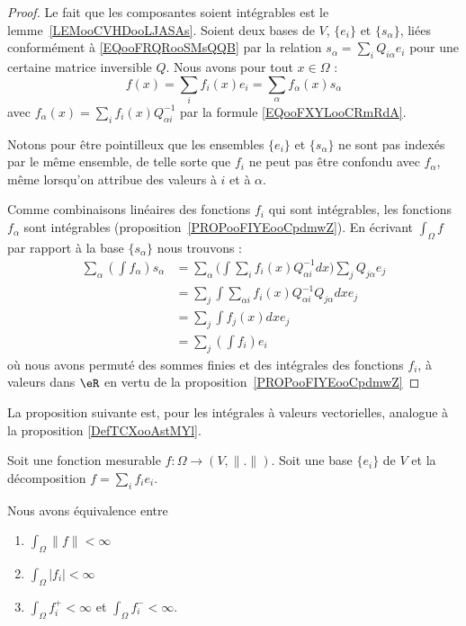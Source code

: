 \begin{proof}
    Le fait que les composantes soient intégrables est le lemme~\ref{LEMooCVHDooLJASAs}. Soient deux bases de \( V\), \( \{ e_i \}\) et \( \{ s_{\alpha} \}\), liées conformément à \eqref{EQooFRQRooSMsQQB} par la relation \( s_{\alpha}=\sum_iQ_{i\alpha}e_i\) pour une certaine matrice inversible \( Q\). Nous avons pour tout \( x\in \Omega\) :
    \begin{equation}
        f(x)=\sum_if_i(x)e_i=\sum_{\alpha}f_{\alpha}(x)s_{\alpha}
    \end{equation}
    avec \( f_{\alpha}(x)=\sum_if_i(x)Q_{\alpha i}^{-1}\) par la formule \eqref{EQooFXYLooCRmRdA}.

    Notons pour être pointilleux que les ensembles \( \{ e_i \}\) et \( \{ s_{\alpha} \}\) ne sont pas indexés par le même ensemble, de telle sorte que \( f_i\) ne peut pas être confondu avec \( f_{\alpha}\), même lorsqu'on attribue des valeurs à \( i\) et à \( \alpha\).

    Comme combinaisons linéaires des fonctions \( f_i\) qui sont intégrables, les fonctions \( f_{\alpha}\) sont intégrables (proposition~\ref{PROPooFIYEooCpdmwZ}). En écrivant \( \int_{\Omega}f\) par rapport à la base \( \{ s_{\alpha} \}\) nous trouvons :
    \begin{subequations}
        \begin{align}
            \sum_{\alpha}(\int f_{\alpha})s_{\alpha}&=\sum_{\alpha}\big( \int \sum_if_i(x)Q_{\alpha i}^{-1}dx \big)\sum_jQ_{j\alpha}e_j\\
            &=\sum_j\int\sum_{\alpha i}f_i(x)Q_{\alpha i}^{-1}Q_{j\alpha}dxe_j\\
            &=\sum_j\int f_j(x)dxe_j\\
            &=\sum_j(\int f_i)e_i
        \end{align}
    \end{subequations}
    où nous avons permuté des sommes finies et des intégrales des fonctions \( f_i\), à valeurs dans \( \eR\) en vertu de la proposition~\ref{PROPooFIYEooCpdmwZ}
\end{proof}

La proposition suivante est, pour les intégrales à valeurs vectorielles, analogue à la proposition \ref{DefTCXooAstMYl}.

\begin{proposition}     \label{PROPooNSCPooCMkrZl}
    Soit une fonction mesurable \( f\colon \Omega\to (V,\| . \|)\). Soit une base \( \{ e_i \}\) de \( V\) et la décomposition \( f=\sum_if_ie_i\).

    Nous avons équivalence entre
    \begin{enumerate}
        \item       \label{ITEMooYLADooCXKEds}
            \( \int_{\Omega}\| f \|<\infty\)
        \item       \label{ITEMooLEYEooQTGwmt}
            \( \int_{\Omega}| f_i |<\infty\)
        \item       \label{ITEMooYDDAooMKwDIR}
            \( \int_{\Omega}f_i^+<\infty\) et \( \int_{\Omega}f_i^-<\infty\).
    \end{enumerate}
\end{proposition}

